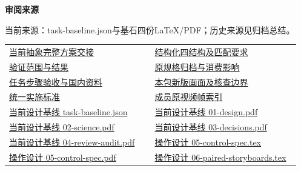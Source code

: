 \documentclass[11pt,a4paper]{article}
\newcommand{\reviewsubsection}[1]{\par\Needspace{4\baselineskip}\vspace{4pt}\begin{center}{\titlelatin\titlecjk\bfseries\fontsize{12}{18}\selectfont #1}\end{center}}
\begin{document}
\begin{minipage}{\linewidth}
\reviewsubsection{3.4 审阅来源}
当前来源：task-\allowbreak{}baseline.json与基石四份LaTeX/\allowbreak{}PDF；历史来源见归档总结。


\begingroup\small\setlength{\tabcolsep}{4pt}\begin{tabular}{@{}p{0.48\linewidth}p{0.48\linewidth}@{}}
\href{file:///D:/Agent/srp/agent/tasks/U-07/outputs/current-abstract.md}{当前抽象完整方案交接} & \href{file:///D:/Agent/srp/agent/tasks/U-07/outputs/current-abstract.json}{结构化四结构及匹配要求}\\[4pt]
\href{file:///D:/Agent/srp/agent/tasks/U-07/evidence/verification.json}{验证范围与结果} & \href{file:///D:/Agent/srp/agent/tasks/U-07/evidence/consumer-impact.md}{原规格归档与消费影响}\\[4pt]
\href{file:///D:/Agent/srp/agent/tasks/U-07/TASK.md}{任务步骤验收与国内资料} & \href{file:///D:/Agent/srp/agent/tasks/U-07/outputs/current-implementation-evidence.md}{本包新版画面及核查边界}\\[4pt]
\href{file:///D:/Agent/srp/agent/design/weather/2026-10-08_Storm\%E4\%B8\%8E\%E7\%BA\%AF\%E7\%B2\%92\%E5\%AD\%90\%E5\%8F\%8C\%E7\%8E\%AF\%E5\%AE\%9E\%E6\%96\%BD\%E6\%A0\%87\%E5\%87\%86.md}{统一实施标准} & \href{file:///D:/Agent/srp/human/assets/previews/2026-10-08/member-storm-particle-rings/frame-index.json}{成员原视频帧索引}\\[4pt]
\href{file:///D:/Agent/srp/agent/design/design-foundation-20261008/task-baseline.json}{当前设计基线 task-\allowbreak{}baseline.json} & \href{file:///D:/Agent/srp/agent/design/design-foundation-20261008/01-design.pdf}{当前设计基线 01-\allowbreak{}design.pdf}\\[4pt]
\href{file:///D:/Agent/srp/agent/design/design-foundation-20261008/02-science.pdf}{当前设计基线 02-\allowbreak{}science.pdf} & \href{file:///D:/Agent/srp/agent/design/design-foundation-20261008/03-decisions.pdf}{当前设计基线 03-\allowbreak{}decisions.pdf}\\[4pt]
\href{file:///D:/Agent/srp/agent/design/design-foundation-20261008/04-review-audit.pdf}{当前设计基线 04-\allowbreak{}review-\allowbreak{}audit.pdf} & \href{file:///D:/Agent/srp/agent/design/design-foundation-20261008/05-control-spec.tex}{操作设计 05-\allowbreak{}control-\allowbreak{}spec.tex}\\[4pt]
\href{file:///D:/Agent/srp/agent/design/design-foundation-20261008/05-control-spec.pdf}{操作设计 05-\allowbreak{}control-\allowbreak{}spec.pdf} & \href{file:///D:/Agent/srp/agent/design/design-foundation-20261008/06-paired-storyboards.tex}{操作设计 06-\allowbreak{}paired-\allowbreak{}storyboards.tex}\\[4pt]

\end{tabular}
\end{minipage}
\end{document}
